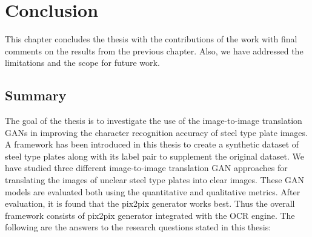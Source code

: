 \chapter{Conclusion}\label{ch:conclusion}
This chapter concludes the thesis with the contributions of the work with final comments on the results from the previous chapter. Also, we have addressed the limitations and the scope for future work.

\section{Summary}
The goal of the thesis is to investigate the use of the image-to-image translation GANs in improving the character recognition accuracy of steel type plate images. A framework has been introduced in this thesis to create a synthetic dataset of steel type plates along with its label pair to supplement the original dataset. We have studied three different image-to-image translation GAN approaches for translating the images of unclear steel type plates into clear images. These GAN models are evaluated both using the quantitative and qualitative metrics. After evaluation, it is found that the pix2pix generator works best. Thus the overall framework consists of pix2pix generator integrated with the OCR engine. The following are the answers to the research questions stated in this thesis:

